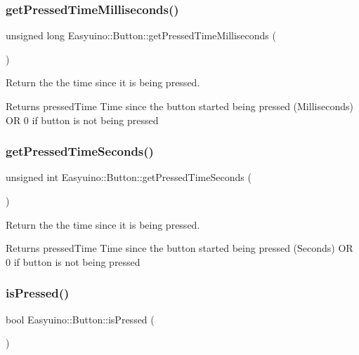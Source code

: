 \subsubsection{\texorpdfstring{get\+Pressed\+Time\+Milliseconds()}{getPressedTimeMilliseconds()}}
{\footnotesize\ttfamily unsigned long Easyuino\+::\+Button\+::get\+Pressed\+Time\+Milliseconds (\begin{DoxyParamCaption}{ }\end{DoxyParamCaption})}



Return the the time since it is being pressed. 

\begin{DoxyReturn}{Returns}
pressed\+Time Time since the button started being pressed (Milliseconds) OR 0 if button is not being pressed 
\end{DoxyReturn}
\mbox{\label{class_easyuino_1_1_button_a492d3c11c2d437753f51bd25ce305966}} 
\subsubsection{\texorpdfstring{get\+Pressed\+Time\+Seconds()}{getPressedTimeSeconds()}}
{\footnotesize\ttfamily unsigned int Easyuino\+::\+Button\+::get\+Pressed\+Time\+Seconds (\begin{DoxyParamCaption}{ }\end{DoxyParamCaption})}



Return the the time since it is being pressed. 

\begin{DoxyReturn}{Returns}
pressed\+Time Time since the button started being pressed (Seconds) OR 0 if button is not being pressed 
\end{DoxyReturn}
\mbox{\label{class_easyuino_1_1_button_ae0cb534e003379ef6ee49c8589a557ab}} 
\subsubsection{\texorpdfstring{is\+Pressed()}{isPressed()}}
{\footnotesize\ttfamily bool Easyuino\+::\+Button\+::is\+Pressed (\begin{DoxyParamCaption}{ }\end{DoxyParamCaption})}



